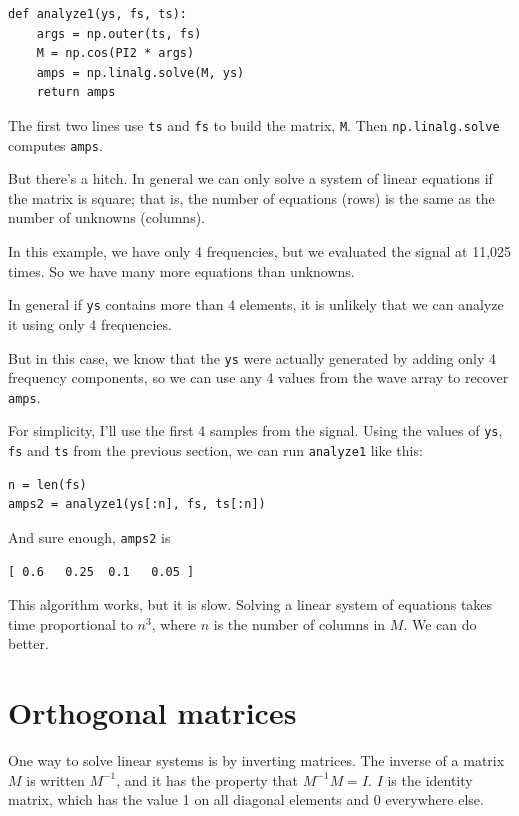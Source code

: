 \documentclass[12pt]{book}
\begin{document}
\begin{verbatim}
def analyze1(ys, fs, ts):
    args = np.outer(ts, fs)
    M = np.cos(PI2 * args)
    amps = np.linalg.solve(M, ys)
    return amps
\end{verbatim}

The first two lines use {\tt ts} and {\tt fs} to build the
matrix, {\tt M}.  Then {\tt np.linalg.solve} computes {\tt amps}.

But there's a hitch.  In general we can only solve a system of linear
equations if the matrix is square; that is, the number of equations
(rows) is the same as the number of unknowns (columns).

In this example, we have only 4 frequencies, but we evaluated the
signal at 11,025 times.  So we have many more equations than unknowns.

In general if {\tt ys}
contains more than 4 elements, it is unlikely that we can analyze it
using only 4 frequencies.

But in this case, we know that the {\tt ys} were actually generated by
adding only 4 frequency components, so we can use any 4 values from
the wave array to recover {\tt amps}.

For simplicity, I'll use the first 4 samples from the signal.
Using the values of {\tt ys}, {\tt fs} and {\tt ts} from
the previous section, we can run {\tt analyze1} like this:

\begin{verbatim}
n = len(fs)
amps2 = analyze1(ys[:n], fs, ts[:n])
\end{verbatim}

And sure enough, {\tt amps2} is

\begin{verbatim}
[ 0.6   0.25  0.1   0.05 ]
\end{verbatim}

This algorithm works, but it is slow.  Solving a linear
system of equations takes time proportional to $n^3$, where $n$ is
the number of columns in $M$.  We can do better.


\section{Orthogonal matrices}

One way to solve linear systems is by inverting matrices.  The
inverse of a matrix $M$ is written $M^{-1}$, and it has the property
that $M^{-1}M = I$.  $I$ is the identity matrix, which has
the value 1 on all diagonal elements and 0 everywhere else.
\end{document}
